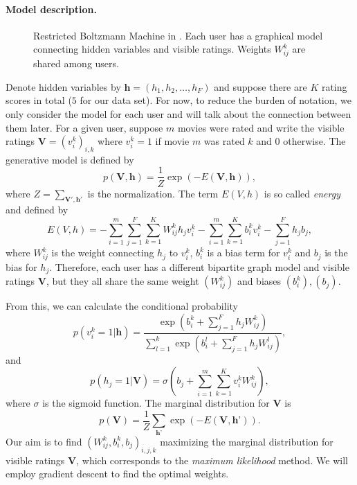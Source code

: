 \documentclass[bj, preprint]{imsart}
\begin{document}
\paragraph{Model description.}\label{par:method.models.rbm.model}

\begin{figure}
	
	\caption{Restricted Boltzmann Machine in . Each user has a graphical model connecting hidden variables and visible ratings. Weights $W_{ij}^{k}$ are shared among users.\label{fig:method.models.rbm}}
\end{figure}



Denote hidden variables by $\textbf{h} = (h_1, h_2,\dots, h_F)$ and suppose there are $K$ rating scores in total ($5$ for our data set). For now, to reduce the burden of notation, we only consider the model for each user and will talk about the connection between them later. For a given user, suppose $m$ movies were rated and write the visible ratings $\textbf{V} = (v_i^k)_{i,k}$ where $v_i^k = 1$ if movie $m$ was rated $k$ and $0$ otherwise. The generative model is defined by
\begin{equation}\label{GenModelRBM}
p(\textbf{V}, \textbf{h}) = \dfrac{1}{Z} \exp(-E(\textbf{V}, \textbf{h})),
\end{equation}
where $Z = \sum_{\textbf{V}', \textbf{h}'}$ is the normalization. The term $E(V, h)$ is so called \textit{energy} and defined by
\begin{equation}\label{EnergyRBM}
E(V,h) = - \sum_{i=1}^{m} \sum_{j=1}^{F} \sum_{k=1}^{K} W_{ij}^k h_j v_i^k - \sum_{i=1}^{m} \sum_{k=1}^{K} b_i^k v_i^k - \sum_{j=1}^{F} h_j b_j,
\end{equation}
where $W_{ij}^k$ is the weight connecting $h_j$ to $v_i^k$, $b_i^k$ is a bias term for $v_i^k$ and $b_j$ is the bias for $h_j$. Therefore, each user has a different bipartite graph model and visible ratings $\textbf{V}$, but they all share the same weight $(W_{ij}^k)$ and biases $(b_i^k), (b_j)$.   

From this, we can calculate the conditional probability 
\begin{equation}\label{pv|h}
p(v_i^k = 1| \textbf{h}) = \dfrac{\exp(b_{i}^{k} + \sum_{j=1}^{F} h_j W_{ij}^k)}{\sum_{l=1}^{k} \exp(b_{i}^{l} + \sum_{j=1}^{F} h_j W_{ij}^l)}, 
\end{equation}
and
\begin{equation}\label{ph|v}
p(h_j = 1 | \textbf{V}) = \sigma(b_j + \sum_{i=1}^{m}\sum_{k=1}^{K} v_i^k W_{ij}^{k}),
\end{equation}
where $\sigma$ is the sigmoid function. The marginal distribution for $\textbf{V}$ is
$$p(\textbf{V}) = \dfrac{1}{Z} \sum_{\textbf{h'}} \exp(-E(\textbf{V}, \textbf{h'})).$$
Our aim is to find $(W_{ij}^{k}, b_{i}^{k}, b_j)_{i,j,k}$ maximizing the marginal distribution for visible ratings $\textbf{V}$, which corresponds to the \textit{maximum likelihood} method. We will employ gradient descent to find the optimal weights. 
\end{document}
